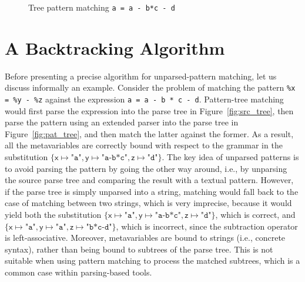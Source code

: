 
\begin{figure}[t]
\caption{Tree pattern matching \texttt{a = a - b*c - d}}
\label{fig:match_ex}
\end{figure}


\section{A Backtracking Algorithm}
\label{backtracking}

Before presenting a precise algorithm for unparsed\hyp{}pattern
matching, let us discuss informally an example. Consider the problem
of matching the pattern \texttt{\%x = \%y - \%z} against the \Clang
expression \texttt{a = a - b * c - d}. Pattern\hyp{}tree matching
would first parse the expression into the parse tree in
Figure~\ref{fig:src_tree}, then parse the pattern using an extended
parser into the parse tree in Figure~\ref{fig:pat_tree}, and then
match the latter against the former. As a result, all the
meta\-variables are correctly bound with respect to the grammar in the
substitution \(\{\textsf{x} \mapsto \texttt{"a"}, \textsf{y} \mapsto
\texttt{"a-b*c"}, \textsf{z} \mapsto \texttt{"d"}\}\). The key idea of
unparsed patterns is to avoid parsing the pattern by going the other
way around, i.e., by unparsing the source parse tree and comparing the
result with a textual pattern. However, if the parse tree is simply
unparsed into a string, matching would fall back to the case of
matching between two strings, which is very imprecise, because it
would yield both the substitution \(\{\textsf{x} \mapsto \texttt{"a"},
\textsf{y} \mapsto \texttt{"a-b*c"}, \textsf{z} \mapsto
\texttt{"d"}\}\), which is correct, and \(\{\textsf{x} \mapsto
\texttt{"a"}, \textsf{y} \mapsto \texttt{"a"}, \textsf{z} \mapsto
\texttt{"b*c-d"}\}\), which is incorrect, since the subtraction
operator is left\hyp{}associative. Moreover, meta\-variables are bound
to strings (i.e., concrete syntax), rather than being bound to
subtrees of the parse tree. This is not suitable when using pattern
matching to process the matched subtrees, which is a common case
within parsing\hyp{}based tools.

